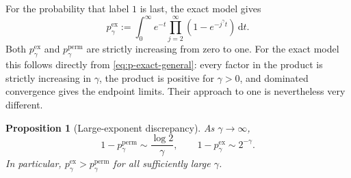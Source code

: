 \documentclass[11pt]{article}
\numberwithin{equation}{section}
\newtheorem{proposition}[theorem]{Proposition}
\theoremstyle{definition}
\theoremstyle{remark}
\newcommand{\dd}{\,\mathrm d}
\begin{document}
For the probability that label $1$ is last, the exact model gives
\begin{equation}
  p_\gamma^{\mathrm{ex}}
  :=\int_0^\infty e^{-t}
  \prod_{j=2}^\infty\left(1-e^{-j^\gamma t}\right)\dd t.
  \label{eq:p-exact-general}
\end{equation}
Both $p_\gamma^{\mathrm{ex}}$ and $p_\gamma^{\mathrm{perm}}$ are strictly increasing from zero to one.  For the exact model this follows directly from \eqref{eq:p-exact-general}: every factor in the product is strictly increasing in $\gamma$, the product is positive for $\gamma>0$, and dominated convergence gives the endpoint limits.  Their approach to one is nevertheless very different.

\begin{proposition}[Large-exponent discrepancy]
\label{prop:large-gamma}
As $\gamma\to\infty$,
\begin{equation}
  1-p_\gamma^{\mathrm{perm}}
  \sim\frac{\log2}{\gamma},
  \qquad
  1-p_\gamma^{\mathrm{ex}}
  \sim2^{-\gamma}.
  \label{eq:large-gamma-asymptotics}
\end{equation}
In particular, $p_\gamma^{\mathrm{ex}}>p_\gamma^{\mathrm{perm}}$ for all sufficiently large $\gamma$.
\end{proposition}
\end{document}
